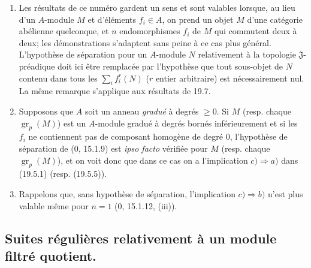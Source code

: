 \begin{remarks}[19.5.6]
\label{IV.19.5.6}
\begin{enumerate}
  \item[(i)] Les résultats de ce numéro gardent un sens et sont valables lorsque, au lieu d'un $A$-module $M$ et d'éléments $f_i\in A$, on prend un objet $M$ d'une catégorie abélienne quelconque, et $n$ endomorphismes $f_i$ de $M$ qui commutent deux à deux; les démonstrations s'adaptent sans peine à ce cas plus général. L'hypothèse de séparation pour un $A$-module $N$ relativement à la topologie $\mathfrak J$-préadique doit ici être remplacée par l'hypothèse que tout sous-objet de $N$ contenu dans tous les $\sum_i f_i^r(N)$ ($r$ entier arbitraire) est nécessairement nul. La même remarque s'applique aux résultats de 19.7.
  \item[(ii)] Supposons que $A$ soit un anneau \emph{gradué} à degrés $\geq0$. Si $M$ (resp. chaque $\operatorname{gr}_p(M)$) est un $A$-module gradué à degrés bornés inférieurement et si les $f_i$ ne contiennent pas de composant homogène de degré $0$, l'hypothèse de séparation de ($0$, 15.1.9) est \emph{ipso facto} vérifiée pour $M$ (resp. chaque $\operatorname{gr}_p(M)$), et on voit donc que dans ce cas on a l'implication $c)\Rightarrow a)$ dans (19.5.1) (resp. (19.5.5)).
  \item[(iii)] Rappelons que, sans hypothèse de séparation, l'implication $c)\Rightarrow b)$ n'est plus valable même pour $n=1$ ($0$, 15.1.12, (iii)).
\end{enumerate}
\end{remarks}

\subsection{Suites régulières relativement à un module filtré quotient.}
\label{subsection:IV.19.6}

